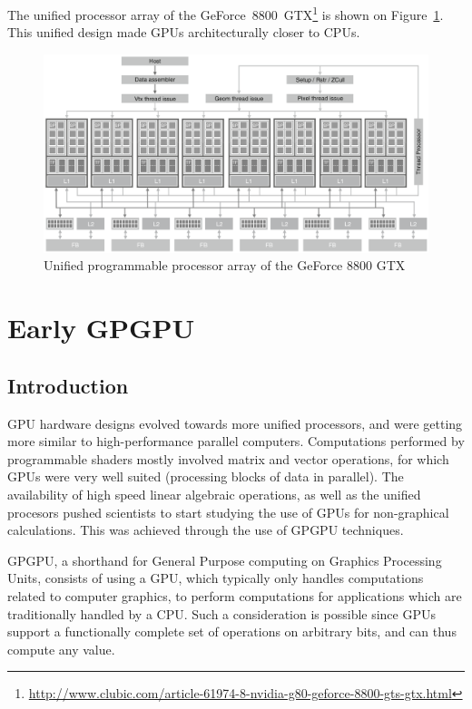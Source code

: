 \documentclass[12pt, a4paper]{report}
\begin{document}
The unified processor array of the GeForce~8800~GTX\footnote{\url{http://www.clubic.com/article-61974-8-nvidia-g80-geforce-8800-gts-gtx.html}} is shown on
Figure~\ref{fig:unified_programmable_processor_array_of_the_GeForce_8800_GTX_graphics_pipeline}.
This unified design made GPUs architecturally closer to CPUs.

\begin{figure}[h]
\includegraphics[width=\linewidth]{figs/unified_programmable_processor_array_of_the_GeForce_8800_GTX_graphics_pipeline}
\caption{Unified programmable processor array of the GeForce 8800 GTX}
\label{fig:unified_programmable_processor_array_of_the_GeForce_8800_GTX_graphics_pipeline}
\end{figure}

\section{Early GPGPU}
\subsection{Introduction}
GPU hardware designs evolved towards more unified processors, and were getting
more similar to high-performance parallel computers.
Computations performed by programmable shaders mostly involved matrix and vector
operations, for which GPUs were very well suited (processing blocks of data in
parallel).
The availability of high speed linear algebraic operations, as well as the
unified procesors pushed scientists to start studying the use of GPUs for
non-graphical calculations.
This was achieved through the use of GPGPU techniques.

GPGPU, a shorthand for General Purpose computing on Graphics Processing Units,
consists of using a GPU, which typically only handles computations related to
computer graphics, to perform computations for applications which are
traditionally handled by a CPU.
Such a consideration is possible since GPUs support a functionally complete set
of operations on arbitrary bits, and can thus compute any value.
\end{document}
